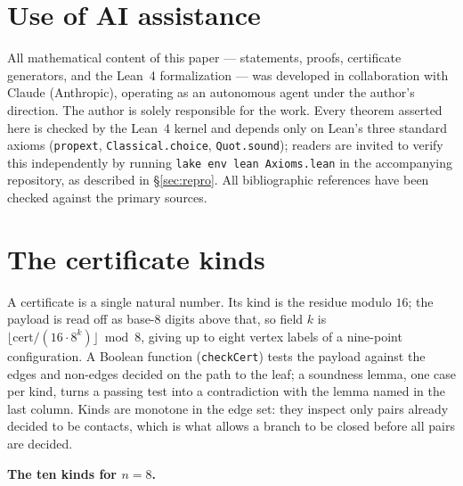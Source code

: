 \documentclass[11pt,a4paper]{article}
\theoremstyle{plain}
\theoremstyle{definition}
\begin{document}
\section*{Use of AI assistance}

All mathematical content of this paper --- statements, proofs, certificate generators,
and the Lean~4 formalization --- was developed in collaboration with Claude (Anthropic),
operating as an autonomous agent under the author's direction. The author is solely
responsible for the work. Every theorem asserted here is checked by the Lean~4 kernel
and depends only on Lean's three standard axioms (\texttt{propext},
\texttt{Classical.choice}, \texttt{Quot.sound}); readers are invited to verify this
independently by running \texttt{lake env lean Axioms.lean} in the accompanying
repository, as described in \S\ref{sec:repro}. All bibliographic references have been
checked against the primary sources.

\appendix

\section{The certificate kinds}
\label{app:certs}

A certificate is a single natural number. Its kind is the residue modulo $16$; the
payload is read off as base-$8$ digits above that, so field $k$ is
$\lfloor \mathrm{cert}/(16\cdot 8^{k})\rfloor \bmod 8$, giving up to eight vertex labels
of a nine-point configuration. A Boolean function (\texttt{checkCert}) tests the payload
against the edges and non-edges decided on the path to the leaf; a soundness lemma, one
case per kind, turns a passing test into a contradiction with the lemma named in the
last column. Kinds are monotone in the edge set: they inspect only pairs already decided
to be contacts, which is what allows a branch to be closed before all pairs are decided.

\medskip
\noindent\textbf{The ten kinds for $n = 8$.}
\end{document}
